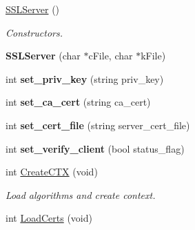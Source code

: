 \begin{DoxyCompactItemize}
\item 
\hypertarget{classSSLServer_a9b6c7b4770c755e7f1d8513737fa23c6}{\hyperlink{classSSLServer_a9b6c7b4770c755e7f1d8513737fa23c6}{S\-S\-L\-Server} ()}\label{classSSLServer_a9b6c7b4770c755e7f1d8513737fa23c6}

\begin{DoxyCompactList}\small\item\em Constructors. \end{DoxyCompactList}\item 
\hypertarget{classSSLServer_a9ab5612246f26d60b7c30a08e6150d7f}{{\bfseries S\-S\-L\-Server} (char $\ast$c\-File, char $\ast$k\-File)}\label{classSSLServer_a9ab5612246f26d60b7c30a08e6150d7f}

\item 
\hypertarget{classSSLServer_ad6028ac4685fee683ab2d25331945c32}{int {\bfseries set\-\_\-priv\-\_\-key} (string priv\-\_\-key)}\label{classSSLServer_ad6028ac4685fee683ab2d25331945c32}

\item 
\hypertarget{classSSLServer_a0e74508f03899329d69906355275fdd3}{int {\bfseries set\-\_\-ca\-\_\-cert} (string ca\-\_\-cert)}\label{classSSLServer_a0e74508f03899329d69906355275fdd3}

\item 
\hypertarget{classSSLServer_adf56c2b15fbff35455f0351724306af1}{int {\bfseries set\-\_\-cert\-\_\-file} (string server\-\_\-cert\-\_\-file)}\label{classSSLServer_adf56c2b15fbff35455f0351724306af1}

\item 
\hypertarget{classSSLServer_ac89eeb7e2b5383d106049c9d83a25449}{int {\bfseries set\-\_\-verify\-\_\-client} (bool status\-\_\-flag)}\label{classSSLServer_ac89eeb7e2b5383d106049c9d83a25449}

\item 
\hypertarget{classSSLServer_adf528cb8d515834fcd83736a7224f375}{int \hyperlink{classSSLServer_adf528cb8d515834fcd83736a7224f375}{Create\-C\-T\-X} (void)}\label{classSSLServer_adf528cb8d515834fcd83736a7224f375}

\begin{DoxyCompactList}\small\item\em Load algorithms and create context. \end{DoxyCompactList}\item 
\hypertarget{classSSLServer_a8948ab8d9f155f6661f41ecbfb284a53}{int \hyperlink{classSSLServer_a8948ab8d9f155f6661f41ecbfb284a53}{Load\-Certs} (void)}\label{classSSLServer_a8948ab8d9f155f6661f41ecbfb284a53}


\end{DoxyCompactItemize}
